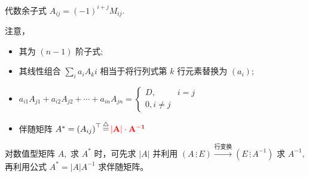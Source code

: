代数余子式 $ A_{ij} = (-1)^{i+j}M_{ij}. $ 

注意，
\begin{itemize}
    \item 其为 $ (n-1) $ 阶子式;
    \item 其线性组合 $ \sum_i a_iA_ki $ 相当于将行列式第 $ k $ 行元素替换为 $ (a_i); $
    \item $ a_{i1}A_{j1} + a_{i2}A_{j2} + \cdots + a_{in}A_{jn} =
    \begin{cases}D,&i=j\\ 0,i\neq j\end{cases} $ 
    \item 伴随矩阵 $ A^* = \left(A_{ij}\right)^\top\mathop=\limits^\triangle \textcolor{red}{\bf{|A|\cdot A^{-1}}}$ 
\end{itemize}

对数值型矩阵 $ A, $ 求 $ A^* $ 时，可先求 $ |A| $ 并利用 $ (A\, \vdots\, E)\xrightarrow{\textrm{行变换}}
(E\, \vdots\, A^{-1}) $ 
求 $ A^{-1}, $ 再利用公式 $ A^* = |A|A^{-1} $ 求伴随矩阵。



